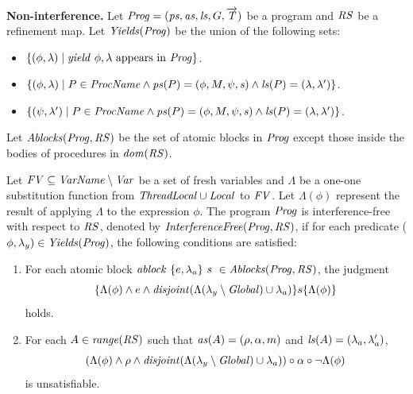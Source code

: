 {\bf Non-interference.}
Let $\mathit{Prog} = (\mathit{ps}, \mathit{as}, \mathit{ls}, G, \overrightarrow{\mathit{T}})$ be a program
and $\mathit{RS}$ be a refinement map.
Let $\mathit{Yields}(\mathit{Prog})$ be the union of the following sets:
\begin{itemize}
\item
$\{(\phi,\lambda) \mid \mathit{yield}\ \phi,\lambda~\mathrm{appears~in~\mathit{Prog}}\}$.
\item
$\{(\phi,\lambda) \mid P \in \mathit{ProcName} \wedge \mathit{ps}(P) = (\phi, M, \psi, \mathit{s}) \wedge \mathit{ls}(P) = (\lambda,\lambda')\}$.
\item
$\{(\psi,\lambda') \mid P \in \mathit{ProcName} \wedge \mathit{ps}(P) = (\phi, M, \psi, \mathit{s}) \wedge \mathit{ls}(P) = (\lambda,\lambda')\}$.
\end{itemize}
Let $\mathit{Ablocks}(\mathit{Prog},\mathit{RS})$ be the set of atomic blocks in $\mathit{Prog}$ except those inside the bodies of procedures
in $\mathit{dom}(\mathit{RS})$.

Let $\mathit{FV} \subseteq \mathit{VarName} \setminus \mathit{Var}$ be a set of fresh variables and $\Lambda$ be a one-one 
substitution function from $\mathit{ThreadLocal} \cup \mathit{Local}$ to $\mathit{FV}$.
Let $\Lambda(\phi)$ represent the result of applying $\Lambda$ to the expression $\phi$.
The program $\mathit{Prog}$ is interference-free with respect to $\mathit{RS}$, denoted by $\mathit{InterferenceFree}(\mathit{Prog},\mathit{RS})$,
if for each predicate ($\phi,\lambda_y) \in \mathit{Yields}(\mathit{Prog})$, the following conditions are satisfied:
\begin{enumerate}
\item
For each atomic block $\mathit{ablock}\ {\{e,\lambda_a\}}\ {s}\  \in \mathit{Ablocks}(\mathit{Prog},\mathit{RS})$, the judgment
\[
\{\Lambda(\phi) \wedge e \wedge \mathit{disjoint}(\Lambda(\lambda_y \setminus \mathit{Global}) \cup \lambda_a)\} s \{\Lambda(\phi)\}
\]
holds.
\item
For each $A \in \mathit{range}(\mathit{RS})$ such that $\mathit{as}(A) = (\rho, \alpha, m)$ and $\mathit{ls}(A) = (\lambda_a,\lambda'_a)$, 
\[
(\Lambda(\phi) \wedge \rho \wedge \mathit{disjoint}(\Lambda(\lambda_y \setminus \mathit{Global}) \cup \lambda_a)) \circ \alpha \circ \neg\Lambda(\phi)
\]
is unsatisfiable.
\end{enumerate}

